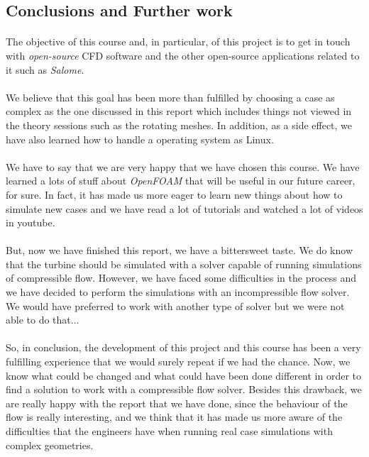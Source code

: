 \subsection{Conclusions and Further work}

\paragraph{}The objective of this course and, in particular, of this project is to get in touch with \textit{open-source} CFD software and the other open-source applications related to it such as \textit{Salome}.

\paragraph{}We believe that this goal has been more than fulfilled by choosing a case as complex as the one discussed in this report which includes things not viewed in the theory sessions such as the rotating meshes. In addition, as a side effect, we have also learned how to handle a operating system as Linux.

\paragraph{}We have to say that we are very happy that we have chosen this course. We have learned a lots of stuff about \textit{OpenFOAM} that will be useful in our future career, for sure. In fact, it has made us more eager to learn new things about how to simulate new cases and we have read a lot of tutorials and watched a lot of videos in youtube.

\paragraph{}But, now we have finished this report, we have a bittersweet taste. We do know that the turbine should be simulated with a solver capable of running simulations of compressible flow. However, we have faced some difficulties in the process and we have decided to perform the simulations with an incompressible flow solver. We would have preferred to work with another type of solver but we were not able to do that...

\paragraph{}So, in conclusion, the development of this project and this course has been a very fulfilling experience that we would surely repeat if we had the chance. Now, we know what could be changed and what could have been done different in order to find a solution to work with a compressible flow solver. Besides this drawback, we are really happy with the report that we have done, since the behaviour of the flow is really interesting, and we think that it has made us more aware of the difficulties that the engineers have when running real case simulations with complex geometries.